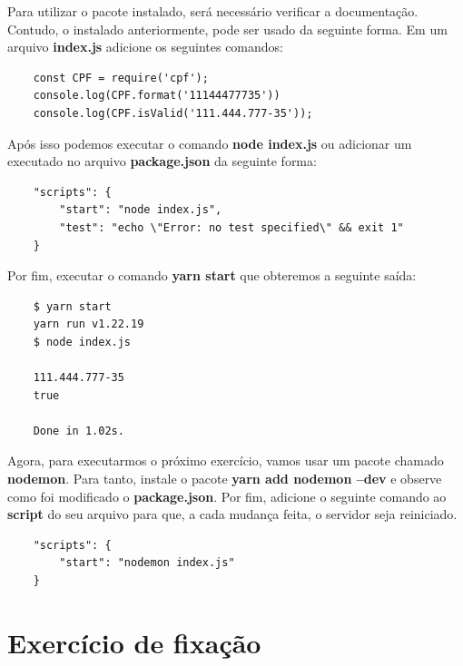 Para utilizar o pacote instalado, será necessário verificar a documentação. Contudo, o instalado anteriormente, pode ser usado da seguinte forma. Em um arquivo \textbf{index.js} adicione os seguintes comandos: 

\begin{verbatim}
	const CPF = require('cpf');
	console.log(CPF.format('11144477735'))
	console.log(CPF.isValid('111.444.777-35'));
\end{verbatim}

Após isso podemos executar o comando \textbf{node index.js} ou adicionar um executado no arquivo \textbf{package.json} da seguinte forma:

\begin{verbatim}
	"scripts": {
		"start": "node index.js",
		"test": "echo \"Error: no test specified\" && exit 1"
	}
\end{verbatim}

Por fim, executar o comando \textbf{yarn start} que obteremos a seguinte saída:

\begin{verbatim}
	$ yarn start
	yarn run v1.22.19
	$ node index.js
	
	111.444.777-35
	true
	
	Done in 1.02s.
\end{verbatim}

Agora, para executarmos o próximo exercício, vamos usar um pacote chamado \textbf{nodemon}. Para tanto, instale o pacote \textbf{yarn add nodemon --dev} e observe como foi modificado o \textbf{package.json}. Por fim, adicione o seguinte comando ao \textbf{script} do seu arquivo para que, a cada mudança feita, o servidor seja reiniciado. 

\begin{verbatim}
	"scripts": {
		"start": "nodemon index.js"
	}
\end{verbatim}

\section{Exercício de fixação}


